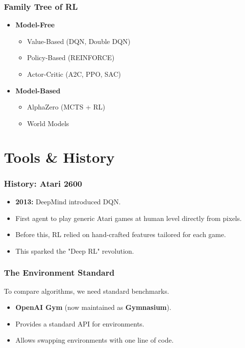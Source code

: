 \documentclass[aspectratio=169]{beamer}
\begin{document}
\begin{frame}
    \frametitle{Family Tree of RL}
    \begin{itemize}
        \item \textbf{Model-Free}
        \begin{itemize}
            \item Value-Based (DQN, Double DQN)
            \item Policy-Based (REINFORCE)
            \item Actor-Critic (A2C, PPO, SAC)
        \end{itemize}
        \item \textbf{Model-Based}
        \begin{itemize}
            \item AlphaZero (MCTS + RL)
            \item World Models
        \end{itemize}
    \end{itemize}
\end{frame}

\section{Tools \& History}

\begin{frame}
    \frametitle{History: Atari 2600}
    \begin{itemize}
        \item \textbf{2013:} DeepMind introduced DQN.
        \item First agent to play generic Atari games at human level directly from pixels.
        \item Before this, RL relied on hand-crafted features tailored for each game.
        \item This sparked the "Deep RL" revolution.
    \end{itemize}
\end{frame}

\begin{frame}
    \frametitle{The Environment Standard}
    To compare algorithms, we need standard benchmarks.
    \vspace{0.5cm}
    \begin{itemize}
        \item \textbf{OpenAI Gym} (now maintained as \textbf{Gymnasium}).
        \item Provides a standard API for environments.
        \item Allows swapping environments with one line of code.
    \end{itemize}
\end{frame}
\end{document}
